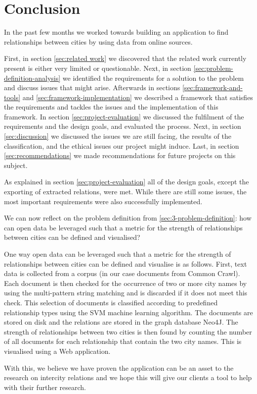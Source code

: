 \chapter{Conclusion}
In the past few months we worked towards building an application to find relationships between cities by using data from online sources.

First, in section \ref{sec:related work} we discovered that the related work currently present is either very limited or questionable. Next, in section \ref{sec:problem-definition-analysis} we identified the requirements for a solution to the problem and discuss issues that might arise. Afterwards in sections \ref{sec:framework-and-tools} and \ref{sec:framework-implementation} we described a framework that satisfies the requirements and tackles the issues and the implementation of this framework. In section \ref{sec:project-evaluation} we discussed the fulfilment of the requirements and the design goals, and evaluated the process. Next, in section \ref{sec:discussion} we discussed the issues we are still facing, the results of the classification, and the ethical issues our project might induce. Last, in section \ref{sec:recommendations} we made recommendations for future projects on this subject.

As explained in section \ref{sec:project-evaluation} all of the design goals, except the exporting of extracted relations, were met. While there are still some issues, the most important requirements were also successfully implemented.

We can now reflect on the problem definition from \ref{sec:3-problem-definition}: how can open data be leveraged such that a metric for the strength of relationships between cities can be defined and visualised?

One way open data can be leveraged such that a metric for the strength of relationships between cities can be defined and visualise is as follows. First, text data is collected from a corpus (in our case documents from Common Crawl). Each document is then checked for the occurrence of two or more city names by using the multi-pattern string matching and is discarded if it does not meet this check. This selection of documents is classified according to predefined relationship types using the SVM machine learning algorithm. The documents are stored on disk and the relations are stored in the graph database Neo4J. The strength of relationships between two cities is then found by counting the number of all documents for each relationship that contain the two city names. This is visualised using a Web application.

With this, we believe we have proven the application can be an asset to the research on intercity relations and we hope this will give our clients a tool to help with their further research. 
